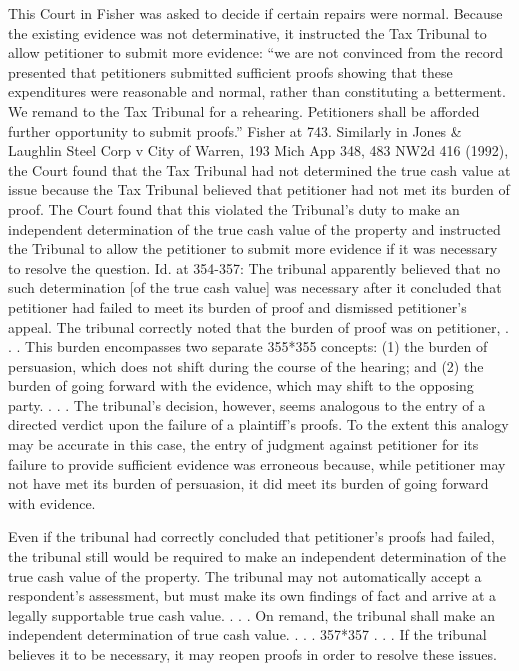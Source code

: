 This Court in Fisher was asked to decide if certain repairs were normal. Because the existing evidence was not determinative, it instructed the Tax Tribunal to allow petitioner to submit more evidence: ``we are not convinced from the record presented that petitioners submitted sufficient proofs showing that these expenditures were reasonable and normal, rather than constituting a betterment. We remand to the Tax Tribunal for a rehearing. Petitioners shall be afforded further opportunity to submit proofs.'' Fisher at 743. 
Similarly in Jones & Laughlin Steel Corp v City of Warren, 193 Mich App 348, 483 NW2d 416 (1992), the Court found that the Tax Tribunal had not determined the true cash value at issue because the Tax Tribunal believed that petitioner had not met its burden of proof. The Court found that this violated the Tribunal's duty to make an independent determination of the true cash value of the property and instructed the Tribunal to allow the petitioner to submit more evidence if it was necessary to resolve the question. Id. at 354-357:
The tribunal apparently believed that no such determination [of the true cash value] was necessary after it concluded that petitioner had failed to meet its burden of proof and dismissed petitioner's appeal. The tribunal correctly noted that the burden of proof was on petitioner, . . .  This burden encompasses two separate 355*355 concepts: (1) the burden of persuasion, which does not shift during the course of the hearing; and (2) the burden of going forward with the evidence, which may shift to the opposing party. . . . The tribunal's decision, however, seems analogous to the entry of a directed verdict upon the failure of a plaintiff's proofs. To the extent this analogy may be accurate in this case, the entry of judgment against petitioner for its failure to provide sufficient evidence was erroneous because, while petitioner may not have met its burden of persuasion, it did meet its burden of going forward with evidence.
 
Even if the tribunal had correctly concluded that petitioner's proofs had failed, the tribunal still would be required to make an independent determination of the true cash value of the property. The tribunal may not automatically accept a respondent's assessment, but must make its own findings of fact and arrive at a legally supportable true cash value. . . . On remand, the tribunal shall make an independent determination of true cash value. . . . 357*357 . . . If the tribunal believes it to be necessary, it may reopen proofs in order to resolve these issues.
 
